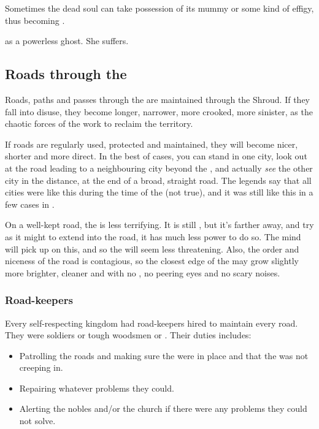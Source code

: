 Sometimes the dead soul can take possession of its mummy or some kind of effigy, thus becoming .

 as a powerless ghost. She suffers.







\subsection{Roads through the \Wylde}
Roads, paths and passes through the \Wylde{} are maintained through the Shroud. If they fall into disuse, they become longer, narrower, more crooked, more sinister, as the chaotic forces of the \Wylde{} work to reclaim the territory. 

If roads are regularly used, protected and maintained, they will become nicer, shorter and more direct. In the best of cases, you can stand in one city, look out at the road leading to a neighbouring city beyond the \Wylde{}, and actually \emph{see} the other city in the distance, at the end of a broad, straight road. The legends say that all cities were like this during the time of the  (not true), and it was still like this in a few cases in . 

On a well-kept road, the \Wylde{} is less terrifying. It is still \Wylde{}, but it's farther away, and try as it might to extend into the road, it has much less power to do so. The mind will pick up on this, and so the \Wylde{} will seem less threatening. Also, the order and niceness of the road is contagious, so the closest edge of the \Wylde{} may grow slightly more \dash brighter, cleaner and with no \wildfog{}, no peering eyes and no scary noises. 





\subsubsection{Road-keepers}
Every self-respecting kingdom had road-keepers hired to maintain every road. 
They were soldiers or tough woodsmen or \rangers.
Their duties includes:
\begin{itemize}
  \item 
    Patrolling the roads and making sure the \eidola were in place and that the \wylde was not creeping in.
  \item 
    Repairing whatever problems they could.
  \item 
    Alerting the nobles and/or the church if there were any problems they could not solve. 
\end{itemize}

